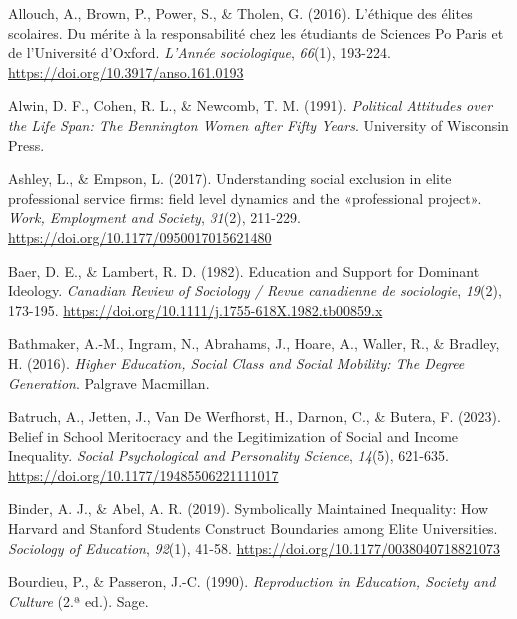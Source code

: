 \documentclass[
  spanish,
  a4paper,
  oneside]{scrbook}
\newlength{\cslhangindent}
\newenvironment{CSLReferences}[2] %
 {\begin{list}{}{%
  \setlength{\itemindent}{0pt}
  \setlength{\leftmargin}{0pt}
  \setlength{\parsep}{0pt}
  \ifodd #1
   \setlength{\leftmargin}{\cslhangindent}
   \setlength{\itemindent}{-1\cslhangindent}
  \fi
  \setlength{\itemsep}{#2\baselineskip}}}
 {\end{list}}
\begin{document}
\protect{}\label{refs}
\begin{CSLReferences}{1}{0}
Allouch, A., Brown, P., Power, S., \& Tholen, G. (2016). L'éthique des
élites scolaires. Du mérite à la responsabilité chez les étudiants de
Sciences Po Paris et de l'Université d'Oxford. \emph{L'Année
sociologique}, \emph{66}(1), 193-224.
\url{https://doi.org/10.3917/anso.161.0193}

Alwin, D. F., Cohen, R. L., \& Newcomb, T. M. (1991). \emph{Political
Attitudes over the Life Span: The Bennington Women after Fifty Years}.
University of Wisconsin Press.

Ashley, L., \& Empson, L. (2017). Understanding social exclusion in
elite professional service firms: field level dynamics and the
{«professional project»}. \emph{Work, Employment and Society},
\emph{31}(2), 211-229. \url{https://doi.org/10.1177/0950017015621480}

Baer, D. E., \& Lambert, R. D. (1982). Education and Support for
Dominant Ideology. \emph{Canadian Review of Sociology / Revue canadienne
de sociologie}, \emph{19}(2), 173-195.
\url{https://doi.org/10.1111/j.1755-618X.1982.tb00859.x}

Bathmaker, A.-M., Ingram, N., Abrahams, J., Hoare, A., Waller, R., \&
Bradley, H. (2016). \emph{Higher Education, Social Class and Social
Mobility: The Degree Generation}. Palgrave Macmillan.

Batruch, A., Jetten, J., Van De Werfhorst, H., Darnon, C., \& Butera, F.
(2023). Belief in {School Meritocracy} and the {Legitimization} of
{Social} and {Income Inequality}. \emph{Social Psychological and
Personality Science}, \emph{14}(5), 621-635.
\url{https://doi.org/10.1177/19485506221111017}

Binder, A. J., \& Abel, A. R. (2019). Symbolically Maintained
Inequality: How Harvard and Stanford Students Construct Boundaries among
Elite Universities. \emph{Sociology of Education}, \emph{92}(1), 41-58.
\url{https://doi.org/10.1177/0038040718821073}

Bourdieu, P., \& Passeron, J.-C. (1990). \emph{Reproduction in
Education, Society and Culture} (2.ª ed.). Sage.


\end{CSLReferences}
\end{document}
